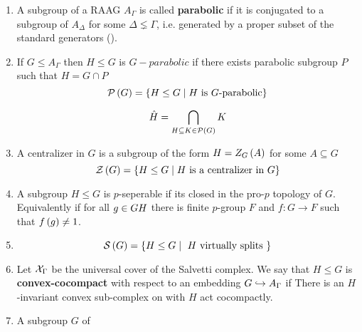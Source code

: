 \documentclass[11pt,a4paper]{article}
\begin{document}
\begin{definition}
    \begin{enumerate}
        \item 
                A subgroup of a RAAG $A_\Gamma$ is called \textbf{parabolic} if it is conjugated to a subgroup of $A_\Delta$ for some $\Delta \lneq \Gamma$, i.e. generated by a proper subset of the standard generators ().
        \item
                If $G\leq A_\Gamma$ then $H\leq G$ is $G-parabolic$ if there exists parabolic subgroup $P$ such that $H=G\cap P$
                \begin{equation*}
                    \mathcal{P} \left(  G  \right) = \left\{  H \leq G \mid \mbox{$H$ is $G$-parabolic}  \right\}
                \end{equation*}
                
                
                \begin{equation*}
                    \hat{H} = \bigcap_{H \subseteq K\in \mathcal{P}\left(  G  \right)} K
                \end{equation*}
        \item
                A centralizer in $G$ is a subgroup of the form $H=Z_G\left(  A  \right)$ for some $A\subseteq G$
                \begin{equation*}
                    \mathcal{Z} \left(  G  \right) = \left\{  H \leq G \mid \mbox{$H$ is a centralizer in $G$}  \right\}
                \end{equation*}
        \item   A subgroup $H\leq G$ is $p$-seperable if its closed in the pro-$p$ topology of $G$. Equivalently if for all $g\in G\\H$ there is finite $p$-group $F$ and $f:G\to F$ such that $f\left(  g  \right)\neq 1 $.
        \item 
                \begin{equation*}
                    \mathcal{S} \left(  G  \right) = \left\{  H \leq G \mid \mbox{ $H$ virtually splits }  \right\}
                \end{equation*} 
        \item
                Let $ \mathcal{X}_{\Gamma} $ be the universal cover of the Salvetti complex. We say that $ H\leq G $ is \textbf{convex-cocompact} with respect to an embedding $ G \hookrightarrow A_{\Gamma} $ if There is an $ H $-invariant convex sub-complex on with $ H $ act cocompactly.
        \item   A subgroup $ G $ of 
    \end{enumerate}
\end{definition}



\printbibliography
\end{document}
